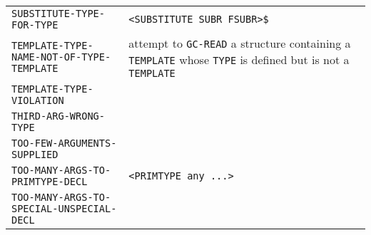 \documentclass[a4paper]{scrbook}
\begin{document}
\begin{longtable}[]{@{}ll@{}}
\begin{minipage}[t]{0.58\columnwidth}\raggedright\strut
\texttt{SUBSTITUTE-TYPE-FOR-TYPE}\strut
\end{minipage} & \begin{minipage}[t]{0.36\columnwidth}\raggedright\strut
\texttt{\textless{}SUBSTITUTE\ SUBR\ FSUBR\textgreater{}\$}\strut
\end{minipage}\tabularnewline
\begin{minipage}[t]{0.58\columnwidth}\raggedright\strut
\texttt{TEMPLATE-TYPE-NAME-NOT-OF-TYPE-TEMPLATE}\strut
\end{minipage} & \begin{minipage}[t]{0.36\columnwidth}\raggedright\strut
attempt to \texttt{GC-READ} a structure containing a \texttt{TEMPLATE} whose \texttt{TYPE} is defined but is not a
\texttt{TEMPLATE}\strut
\end{minipage}\tabularnewline
\begin{minipage}[t]{0.58\columnwidth}\raggedright\strut
\texttt{TEMPLATE-TYPE-VIOLATION}\strut
\end{minipage} & \begin{minipage}[t]{0.36\columnwidth}\raggedright\strut
\strut
\end{minipage}\tabularnewline
\begin{minipage}[t]{0.58\columnwidth}\raggedright\strut
\texttt{THIRD-ARG-WRONG-TYPE}\strut
\end{minipage} & \begin{minipage}[t]{0.36\columnwidth}\raggedright\strut
\strut
\end{minipage}\tabularnewline
\begin{minipage}[t]{0.58\columnwidth}\raggedright\strut
\texttt{TOO-FEW-ARGUMENTS-SUPPLIED}\strut
\end{minipage} & \begin{minipage}[t]{0.36\columnwidth}\raggedright\strut
\strut
\end{minipage}\tabularnewline
\begin{minipage}[t]{0.58\columnwidth}\raggedright\strut
\texttt{TOO-MANY-ARGS-TO-PRIMTYPE-DECL}\strut
\end{minipage} & \begin{minipage}[t]{0.36\columnwidth}\raggedright\strut
\texttt{\textless{}PRIMTYPE\ any\ ...\textgreater{}}\strut
\end{minipage}\tabularnewline
\begin{minipage}[t]{0.58\columnwidth}\raggedright\strut
\texttt{TOO-MANY-ARGS-TO-SPECIAL-UNSPECIAL-DECL}\strut

\end{minipage}
\end{longtable}
\end{document}
